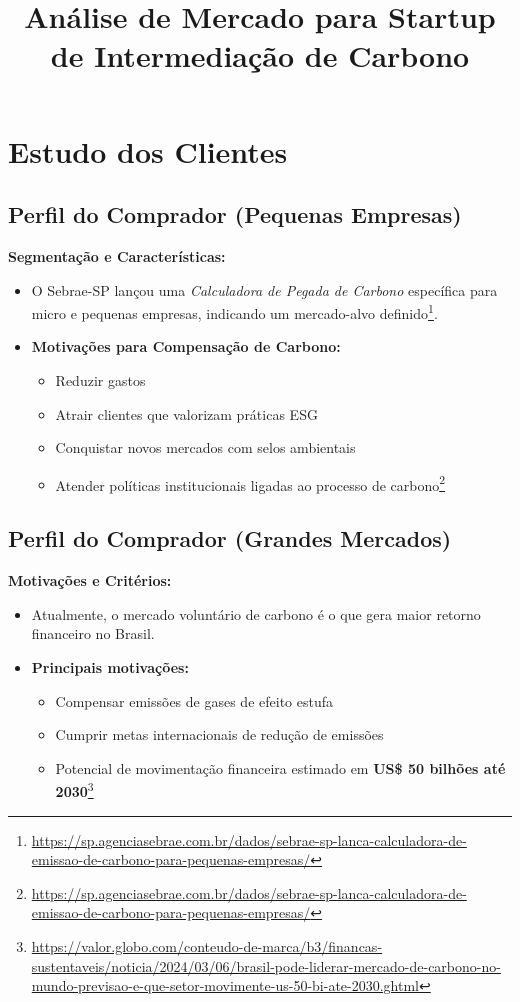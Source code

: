 \documentclass[a4paper,12pt]{article}
\title{Análise de Mercado para Startup de Intermediação de Carbono}
\author{}
\date{}
\begin{document}
\maketitle

\section{Estudo dos Clientes}

\subsection{Perfil do Comprador (Pequenas Empresas)}

\textbf{Segmentação e Características:}
\begin{itemize}
    \item O Sebrae-SP lançou uma \textit{Calculadora de Pegada de Carbono} específica para micro e pequenas empresas, indicando um mercado-alvo definido\footnote{\url{https://sp.agenciasebrae.com.br/dados/sebrae-sp-lanca-calculadora-de-emissao-de-carbono-para-pequenas-empresas/}}.
    \item \textbf{Motivações para Compensação de Carbono:}
    \begin{itemize}
        \item Reduzir gastos
        \item Atrair clientes que valorizam práticas ESG
        \item Conquistar novos mercados com selos ambientais
        \item Atender políticas institucionais ligadas ao processo de carbono\footnote{\url{https://sp.agenciasebrae.com.br/dados/sebrae-sp-lanca-calculadora-de-emissao-de-carbono-para-pequenas-empresas/}}
    \end{itemize}
\end{itemize}

\subsection{Perfil do Comprador (Grandes Mercados)}

\textbf{Motivações e Critérios:}
\begin{itemize}
    \item Atualmente, o mercado voluntário de carbono é o que gera maior retorno financeiro no Brasil.
    \item \textbf{Principais motivações:}
    \begin{itemize}
        \item Compensar emissões de gases de efeito estufa
        \item Cumprir metas internacionais de redução de emissões
        \item Potencial de movimentação financeira estimado em \textbf{US\$ 50 bilhões até 2030}\footnote{\url{https://valor.globo.com/conteudo-de-marca/b3/financas-sustentaveis/noticia/2024/03/06/brasil-pode-liderar-mercado-de-carbono-no-mundo-previsao-e-que-setor-movimente-us-50-bi-ate-2030.ghtml}}
    \end{itemize}
\end{itemize}
\end{document}
